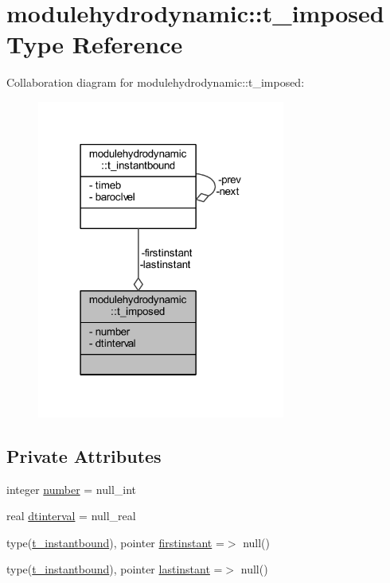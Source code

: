 \hypertarget{structmodulehydrodynamic_1_1t__imposed}{}\section{modulehydrodynamic\+:\+:t\+\_\+imposed Type Reference}
\label{structmodulehydrodynamic_1_1t__imposed}


Collaboration diagram for modulehydrodynamic\+:\+:t\+\_\+imposed\+:\nopagebreak
\begin{figure}[H]
\begin{center}
\leavevmode
\includegraphics[width=231pt]{structmodulehydrodynamic_1_1t__imposed__coll__graph}
\end{center}
\end{figure}
\subsection*{Private Attributes}
\begin{DoxyCompactItemize}
\item 
integer \mbox{\hyperlink{structmodulehydrodynamic_1_1t__imposed_a95d59863d7ab1652b2e9e2547ca442d0}{number}} = null\+\_\+int
\item 
real \mbox{\hyperlink{structmodulehydrodynamic_1_1t__imposed_aa35e67ab01e55ad7794813fea3768713}{dtinterval}} = null\+\_\+real
\item 
type(\mbox{\hyperlink{structmodulehydrodynamic_1_1t__instantbound}{t\+\_\+instantbound}}), pointer \mbox{\hyperlink{structmodulehydrodynamic_1_1t__imposed_a12a8fb7f874e0ccade733567abcde256}{firstinstant}} =$>$ null()
\item 
type(\mbox{\hyperlink{structmodulehydrodynamic_1_1t__instantbound}{t\+\_\+instantbound}}), pointer \mbox{\hyperlink{structmodulehydrodynamic_1_1t__imposed_a5429e98d1a32434e62f8edb701d56cc9}{lastinstant}} =$>$ null()
\end{DoxyCompactItemize}


